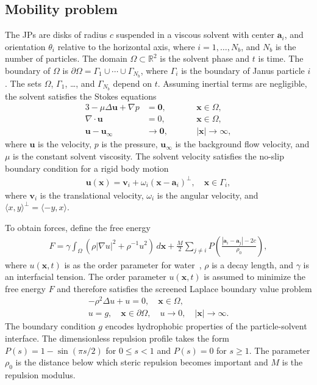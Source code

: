 \documentclass[prb,preprint,showpacs,preprintnumbers,amsmath,amssymb,longbibliography]{revtex4-2}
\renewcommand{\aa}{\mathbf{a}}
\newcommand{\bd}{\partial}
\newcommand{\xx}{\mathbf{x}}
\newcommand{\uu}{\mathbf{u}}
\renewcommand{\vv}{\mathbf{v}}
\begin{document}
\subsection{Mobility problem}
The JPs are disks of radius $c$ suspended in a viscous solvent with
center $\aa_i$, and orientation $\theta_i$ relative to the horizontal
axis, where $i = 1, \ldots, N_b$, and $N_b$ is the number of particles.
The domain $\Omega \subset \mathbb{R}^2$ is the solvent phase and $t$ is
time. The boundary of $\Omega$ is $\bd\Omega = \Gamma_1 \cup \cdots \cup
\Gamma_{N_b}$, where $\Gamma_i$ is the boundary of Janus particle $i$.
The sets $\Omega$, $\Gamma_1$, \dots, and $\Gamma_{N_b}$ depend on $t$.
Assuming inertial terms are negligible, the solvent satisfies the Stokes
equations
\begin{alignat}{3}
\label{eq:stokes}
  -\mu \Delta \uu + \nabla p &= \mathbf{0}, && \xx \in \Omega, \\
\label{eq:stokesMass}
  \nabla\cdot \uu &= 0, \qquad && \xx \in \Omega, \\
\label{eq:stokesFarfield}
  \uu - \uu_\infty &\to \mathbf{0}, && |\xx| \to \infty,
\end{alignat}
where $\uu$ is the velocity, $p$ is the pressure,
$\uu_\infty$ is the background flow velocity, and $\mu$ is the constant
solvent viscosity. The solvent velocity satisfies the no-slip boundary
condition for a rigid body motion
\begin{align}
  \label{eq:rigid-vel}
  \uu(\xx) = \vv_i + \omega_i (\xx - \aa_i)^\perp, 
    \quad \xx \in \Gamma_i,
\end{align}
where $\vv_i$ is the translational velocity, $\omega_i$ is the angular
velocity, and $\langle x, y \rangle^{\perp} = \langle -y, x\rangle$. 

To obtain forces, define the free
energy~\cite{Fu20, Fu2022_JFM}
\begin{align}
\label{eq:free_energy}
F = \gamma
  \int_{\Omega} \left(\rho |\nabla u|^2 + \rho^{-1} u^2 \right)
\,d\xx
+ \frac{M}{2}
\sum_{j \neq i} 
P\left(\frac{|\aa_i - \aa_j|-2c}{\rho_0}\right),
\end{align}
where $u(\xx,t)$ is as the order parameter for water~\cite{Ma77,
GoHaKo94}, $\rho$ is a decay length, and $\gamma$ is an interfacial
tension. The order parameter $u(\xx,t)$ is assumed to minimize the free
energy $F$ and therefore satisfies the screened Laplace boundary value
problem
\begin{gather}
  \label{eq:SL}
  -\rho^2 \Delta u + u = 0,\quad \xx \in \Omega, \\
  \label{eq:SLbc}
  u = g, \quad \xx \in \bd\Omega, \quad 
  u \rightarrow 0, \quad |\xx| \rightarrow \infty.
\end{gather}
The boundary condition $g$ encodes hydrophobic properties of the
particle-solvent interface.  The dimensionless repulsion profile takes
the form $P(s) = 1 - \sin(\pi s/2)$ for $0 \leq s < 1$ and $P(s) = 0$
for $s \geq 1$. The parameter $\rho_0$ is the distance below which
steric repulsion becomes important and $M$ is the repulsion modulus.
\end{document}

